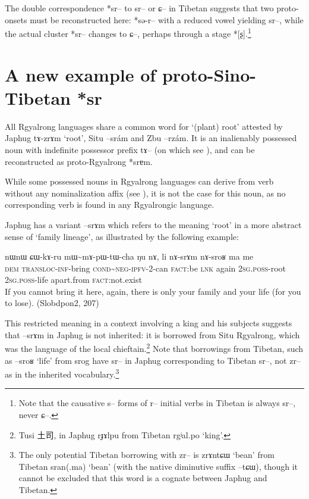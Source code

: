 \documentclass[oldfontcommands,oneside,a4paper,11pt]{article}
\newcommand{\ipa}[1]{{\phon #1}} %
\newcommand{\zh}[1]{{\cn #1}}
\begin{document}
The double correspondence *\ipa{sr--} to \ipa{sr--} or \ipa{ɕ--} in Tibetan suggests that two proto-onsets must be reconstructed here: *\ipa{sə-r--} with a reduced vowel yielding \ipa{sr--}, while the actual cluster *\ipa{sr--} changes to \ipa{ɕ--}, perhaps through a stage *[\ipa{ʂ}].\footnote{Note that the causative \ipa{s--} forms of \ipa{r--} initial verbs in Tibetan is always \ipa{sr--}, never \ipa{ɕ--}.}



\section{A new example of proto-Sino-Tibetan *\ipa{sr}}
All Rgyalrong languages share a common word for `(plant) root' attested by Japhug \ipa{tɤ-zrɤm} `root', Situ \ipa{--srám} and Zbu \ipa{--rzám}. It is an inalienably possessed noun with indefinite possessor prefix \ipa{tɤ--} (on which see \citealt[4-5]{jacques14antipassive}), and can be reconstructed as proto-Rgyalrong *\ipa{srɐm}.

While some possessed nouns in Rgyalrong languages can derive from verb without any nominalization affix (see \citealt[3-7]{jacques14antipassive}), it is not the case for this noun, as no corresponding verb is found in any Rgyalrongic language.

Japhug has a variant \ipa{--srɤm} which refers to the meaning `root' in a more abstract sense of `family lineage', as illustrated by the following example:

\begin{exe}
\ex \label{ex:sram}
\gll
\ipa{nɯnɯ} 	\ipa{ɕɯ-kɤ-ru} 	\ipa{mɯ\textasciitilde{}mɤ-pɯ-tɯ-cha} 	\ipa{ŋu} 	\ipa{nɤ,} 	\ipa{li} 	\ipa{nɤ-srɤm} 	\ipa{nɤ-sroʁ} 	\ipa{ma} 	\ipa{me} \\
\textsc{dem} \textsc{transloc-inf}-bring \textsc{cond\textasciitilde{}neg-ipfv}-2-can \textsc{fact}:be \textsc{lnk} again \textsc{2sg.poss}-root \textsc{2sg.poss}-life apart.from \textsc{fact}:not.exist\\
\glt If you cannot bring it here, again, there is only your family and your life (for you to lose). (Slobdpon2, 207)
\end{exe}

This restricted meaning in a context involving a king and his subjects suggests that \ipa{--srɤm} in Japhug is not inherited: it is borrowed from Situ Rgyalrong, which was the language of the local chieftain.\footnote{Tusi \zh{土司}, in Japhug \ipa{rɟɤlpu} from Tibetan \ipa{rgʲal.po} `king'.} Note that  borrowings from Tibetan, such as \ipa{--sroʁ} `life' from \ipa{srog} have \ipa{sr--} in Japhug corresponding to Tibetan \ipa{sr--}, not \ipa{zr--} as in the inherited vocabulary.\footnote{The only potential Tibetan borrowing with  \ipa{zr--} is \ipa{zrɤntɕɯ} `bean' from Tibetan \ipa{sran(.ma)} `bean' (with the native diminutive suffix \ipa{--tɕɯ}), though it cannot be excluded that this word is a cognate between Japhug and Tibetan. }
\end{document}

